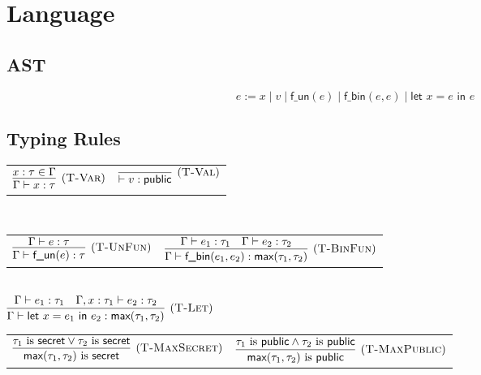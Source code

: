 \documentclass{article}
\begin{document}
\section{Language}
\subsection{AST}

\[ e := x \mid v \mid \textsf{f\_un}(e) \mid \textsf{f\_bin}(e, e) \mid \textsf{let } x = e \textsf{ in } e \]


\subsection{Typing Rules}

\centering
\begin{tabular}{cc}
$\infer[(\textsc{T-Var})]{
    \Gamma \vdash x : \tau
}{
    x : \tau \in \Gamma
}$ &

$\infer[(\textsc{T-Val})]{
    \vdash v : \textsf{public}
}{}$
\end{tabular} \\

\vspace{0.5cm}
\centering
\begin{tabular}{cc}
$\infer[(\textsc{T-UnFun})]{ \Gamma \vdash \textsf{f\_un}(e) : \tau }{ \Gamma \vdash e : \tau }$ &

$\infer[(\textsc{T-BinFun})]{ 
    \Gamma \vdash \textsf{f\_bin}(e_1, e_2) : \textsf{max}(\tau_1, \tau_2) 
}{
    \Gamma \vdash e_1 : \tau_1
    & \Gamma \vdash e_2 : \tau_2
}$
\end{tabular} \\

\vspace{0.5cm}
\centering
$\infer[(\textsc{T-Let})]{
    \Gamma \vdash \textsf{let } x = e_1 \textsf{ in } e_2 : \textsf{max}(\tau_1, \tau_2) 
}{
    \Gamma \vdash e_1 : \tau_1
    & \Gamma, x : \tau_1 \vdash e_2 : \tau_2
}$

\vspace{0.5cm}
\centering
\begin{tabular}{cc}
$\infer[(\textsc{T-MaxSecret})]{ \textsf{max}(\tau_1, \tau_2) \text{ is } \textsf{secret} }{ \tau_1 \text{ is } \textsf{secret} \lor \tau_2 \text{ is } \textsf{secret} }$ &

$\infer[(\textsc{T-MaxPublic})]{ \textsf{max}(\tau_1, \tau_2) \text{ is } \textsf{public} }{ \tau_1 \text{ is } \textsf{public} \land \tau_2 \text{ is } \textsf{public} }$
\end{tabular}
\end{document}
